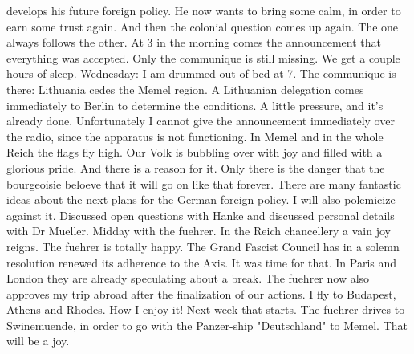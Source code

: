 develops his future foreign policy. He now wants to bring some calm, in order to earn some trust again. And then the colonial question comes up again. The one always follows the other. At 3 in the morning comes the announcement that everything was accepted. Only the communique is still missing. We get a couple hours of sleep.
Wednesday: I am drummed out of bed at 7. The communique is there: Lithuania cedes the Memel region. A Lithuanian delegation comes immediately to Berlin to determine the conditions.  A little pressure, and it's already done. Unfortunately I cannot give the announcement immediately over the radio, since the apparatus is not functioning. In Memel and in the whole Reich the flags fly high. Our Volk is bubbling over with joy and filled with a glorious pride. And there is a reason for it. Only there is the danger that the bourgeoisie beloeve that it will go on like that forever. There are many fantastic ideas about the next plans for the German foreign policy. I will also polemicize against it. Discussed open questions with Hanke and discussed personal details with Dr Mueller. Midday with the fuehrer. In the Reich chancellery a vain joy reigns. The fuehrer is totally happy. The Grand Fascist Council has in a solemn resolution renewed its adherence to the Axis. It was time for that. In Paris and London they are already speculating about a break. The fuehrer now also approves my trip abroad after the finalization of our actions. I fly to Budapest, Athens and Rhodes. How I enjoy it! Next week that starts. The fuehrer drives to Swinemuende, in order to go with the Panzer-ship "Deutschland" to Memel. That will be a joy. \missing

